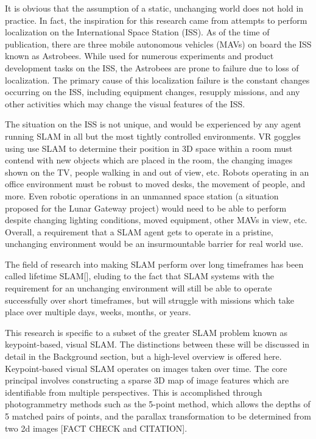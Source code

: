 It is obvious that the assumption of a static, unchanging world does not hold in practice. In fact, the inspiration for this research came from attempts to perform localization on the International Space Station (ISS). As of the time of publication, there are three mobile autonomous vehicles (MAVs) on board the ISS known as Astrobees. While used for numerous experiments and product development tasks on the ISS, the Astrobees are prone to failure due to loss of localization. The primary cause of this localization failure is the constant changes occurring on the ISS, including equipment changes, resupply missions, and any other activities which may change the visual features of the ISS.

The situation on the ISS is not unique, and would be experienced by any agent running SLAM in all but the most tightly controlled environments. VR goggles using use SLAM to determine their position in 3D space within a room must contend with new objects which are placed in the room, the changing images shown on the TV, people walking in and out of view, etc. Robots operating in an office environment must be robust to moved desks, the movement of people, and more. Even robotic operations in an unmanned space station (a situation proposed for the Lunar Gateway project) would need to be able to perform despite changing lighting conditions, moved equipment, other MAVs in view, etc. Overall, a requirement that a SLAM agent gets to operate in a pristine, unchanging environment would be an insurmountable barrier for real world use.

The field of research into making SLAM perform over long timeframes has been called lifetime SLAM[], eluding to the fact that SLAM systems with the requirement for an unchanging environment will still be able to operate successfully over short timeframes, but will struggle with missions which take place over multiple days, weeks, months, or years.

This research is specific to a subset of the greater SLAM problem known as keypoint-based, visual SLAM. The distinctions between these will be discussed in detail in the Background section, but a high-level overview is offered here. Keypoint-based visual SLAM operates on images taken over time. The core principal involves constructing a sparse 3D map of image features which are identifiable from multiple perspectives. This is accomplished through photogrammetry methods such as the 5-point method, which allows the depths of 5 matched pairs of points, and the parallax transformation to be determined from two 2d images [FACT CHECK and CITATION].

